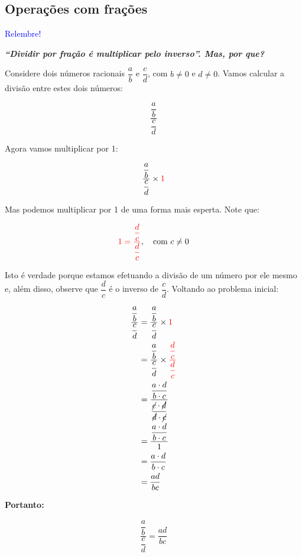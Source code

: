 \documentclass[12pt,openright,twoside,a4paper]{article}
\theoremstyle{definition}
\begin{document}
	\subsection{Operações com frações}
	\begin{snugshade}
		\textcolor{blue}{Relembre!}
		
		\textit{\textbf{``Dividir por fração é multiplicar pelo inverso''. Mas, por que?}}
		
		Considere dois números racionais \( \dfrac{a}{b} \) e \( \dfrac{c}{d} \), com \( b \neq 0 \) e \( d \neq 0 \).  
		Vamos calcular a divisão entre estes dois números:
		
		
		
		\[
		\dfrac{\dfrac{a}{b}}{\dfrac{c}{d}}
		\]
		
		
		
		Agora vamos multiplicar por 1:
		
		
		
		\[
		\dfrac{\dfrac{a}{b}}{\dfrac{c}{d}} \times \textcolor{red}{1}
		\]
		
		
		
		Mas podemos multiplicar por 1 de uma forma mais esperta. Note que:
		
		
	\begin{align*}
		\textcolor{red}{1 = \dfrac{\dfrac{d}{c}}{\dfrac{d}{c}}}, \quad \text{com } c \neq 0
	\end{align*}
		
		
		
		Isto é verdade porque estamos efetuando a divisão de um número por ele mesmo e, além disso, observe que \( \dfrac{d}{c} \) é o inverso de \( \dfrac{c}{d} \). Voltando ao problema inicial:
		
		
		
		\begin{align*}
			\dfrac{\dfrac{a}{b}}{\dfrac{c}{d}} &= \dfrac{\dfrac{a}{b}}{\dfrac{c}{d}} \times \textcolor{red}{1}\\
			&= \dfrac{\dfrac{a}{b}}{\dfrac{c}{d}} \times \textcolor{red}{\dfrac{\dfrac{d}{c}}{\dfrac{d}{c}}} \\
			&= \dfrac{\dfrac{a\cdot d}{b \cdot c}}{\dfrac{\cancel{c} \cdot \cancel{d}}{\cancel{d} \cdot \cancel{c}}}\\
			&= \dfrac{\dfrac{a\cdot d}{b \cdot c}}{1}\\
			&= \dfrac{a\cdot d}{b \cdot c}\\
			&= \dfrac{ad}{bc}
		\end{align*}
		
		\textbf{Portanto:}
		
		
		
		\begin{align*}
			\dfrac{\dfrac{a}{b}}{\dfrac{c}{d}} = \dfrac{ad}{bc}
		\end{align*}
		
	\end{snugshade}
	
\end{document}
